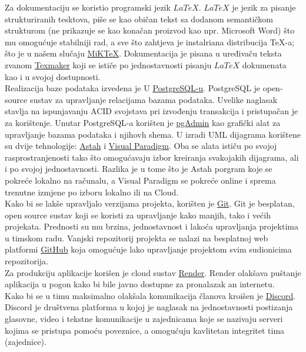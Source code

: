 			Za dokumentaciju se koristio programski jezik \href{https://www.latex-project.org//}{$LaTeX$}. $LaTeX$ je jezik za pisanje strukturiranih tesktova, piše se kao običan tekst sa dodanom semantičkom strukturom (ne prikazuje se kao konačan proizvod kao npr. Microsoft Word) što mu omogućuje stabilniji rad, a sve što zahtjeva je instalriana distribucija TeX-a; što je u našem slučaju \href{https://miktex.org/}{MiKTeX}. Dokumentacija je pisana u uređivaču teksta zvanom \href{https://www.xm1math.net/texmaker/}{Texmaker} koji se ističe po jednostavnosti pisanju $LaTeX$ dokumenata kao i u svojoj dostupnosti.\\
			Realizacija baze podataka izvedena je U \href{https://www.postgresql.org/}{PostgreSQL-u}. PostgreSQL je open-source sustav za upravljanje relacijama bazama podataka. Uvelike naglasak stavlja na ispunjavanju ACID svojstava pri izvođenju transakcija i pristupačan je za korištenje. Unutar PostgreSQL-a korišten je \href{https://www.pgadmin.org/}{pgAdmin} kao grafički alat za upravljanje bazama podataka i njihovh shema.
			U izradi UML dijagrama korištene su dvije tehnologije: \href{https://astah.net/}{Astah} i \href{https://www.visual-paradigm.com/}{Visual Paradigm}. Oba se alata ističu po svojoj rasprostranjenosti tako što omogućavaju izbor kreiranja svakojakih dijagrama, ali i po svojoj jednostavnosti. Razlika je u tome što je Astah porgram koje se pokreće lokalno na računalu, a Visual Paradigm se pokreće online i sprema trenutne izmjene po izboru lokalno ili na Cloud.\\
			Kako bi se lakše upravljalo verzijama projekta, korišten je \href{https://git-scm.com/}{Git}. Git je besplatan, open source sustav koji se koristi za upravljanje kako manjih, tako i većih projekata. Prednosti su mu brzina, jednostavnost i lakoća upravljanja projektima u timskom radu. Vanjski repozitorij projekta se nalazi na besplatnoj web platformi \href{https://github.com/}{GitHub} koja omogućuje lako upravljanje projektom svim sudionicima repozitorija. \\
			Za produkciju aplikacije korišen je cloud sustav \href{https://render.com/}{Render}. Render olakšava puštanje aplikacija u pogon kako bi bile javno dostupne za pronalazak an internetu. \\
			Kako bi se u timu maksimalno olakšala komunikacija članova kroišen je \href{https://discord.com/}{Discord}. Discord je društvena platforma u kojoj je naglasak na jednostavnosti postizanja glasovne, video i tekstne komunikacije u zajednicama koje se nazivaju serveri kojima se pristupa pomoću poveznice, a omogućuju kavlitetan integritet tima (zajednice).
			\eject 
		
